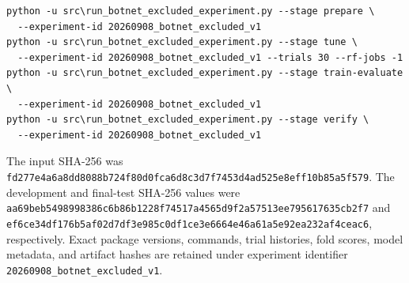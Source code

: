 \begin{verbatim}
python -u src\run_botnet_excluded_experiment.py --stage prepare \
  --experiment-id 20260908_botnet_excluded_v1
python -u src\run_botnet_excluded_experiment.py --stage tune \
  --experiment-id 20260908_botnet_excluded_v1 --trials 30 --rf-jobs -1
python -u src\run_botnet_excluded_experiment.py --stage train-evaluate \
  --experiment-id 20260908_botnet_excluded_v1
python -u src\run_botnet_excluded_experiment.py --stage verify \
  --experiment-id 20260908_botnet_excluded_v1
\end{verbatim}

The input SHA-256 was
\texttt{fd277e4a6a8dd8088b724f80d0fca6d8c3d7f7453d4ad525e8eff10b85a5f579}.
The development and final-test SHA-256 values were
\texttt{aa69beb5498998386c6b86b1228f74517a4565d9f2a57513ee795617635cb2f7}
and
\texttt{ef6ce34df176b5af02d7df3e985c0df1ce3e6664e46a61a5e92ea232af4ceac6},
respectively. Exact package versions, commands, trial histories, fold
scores, model metadata, and artifact hashes are retained under experiment
identifier \texttt{20260908\_botnet\_excluded\_v1}.
